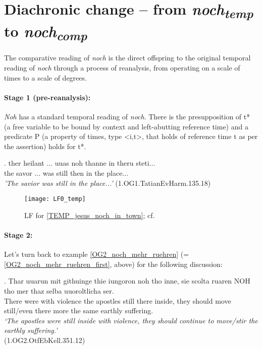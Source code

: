 \documentclass[output=paper,
modfonts
]{langscibook}
\begin{document}

\section{Diachronic change -- from \textit{noch\textsubscript{temp}} to \textit{noch\textsubscript{comp}}}\label{sec_diachr_analysis}

The comparative reading of \textit{noch} is the direct offspring to the original temporal reading of \textit{noch} through a process of reanalysis, from operating on a scale of times to a scale of degrees.

\paragraph*{Stage 1 (pre-reanalysis):} \textit{Noh} has a standard temporal reading of \textit{noch}. There is the presupposition of t* (a free variable to be bound by context and left-abutting reference time) and a predicate P (a property of times, type <i,t>, that holds of reference time t as per the assertion) holds for t*.

\exg. ther heilant ... uuas noh thanne in theru steti...\\
the savor ... was still then in the place...\\
\textit{'The savior was still in the place...'}
(1.OG1.TatianEvHarm.135.18)\label{TEMP_jesus_noch_in_town}

\begin{figure}[H]
\texttt{[image: LF0\_temp]}
\caption{LF for \ref{TEMP_jesus_noch_in_town}; cf. \citep{beck2016a_sub}}
\label{fig:LF_TEMP_jesus_noch_in_town}
\end{figure}

\paragraph*{Stage 2:} Let's turn back to example \ref{OG2_noch_mehr_ruehren} (= \ref{OG2_noch_mehr_ruehren_first}, above) for the following discussion:

\exg. Thar uuarun mit githuinge thie iungoron noh tho inne, sie scolta ruaren NOH tho mer thaz selba uuoroltlicha ser.\\
There were with violence the apostles still there inside, they should move still/even there more the same earthly suffering.\\
\textit{`The apostles were still inside with violence, they should continue to move/stir the earthly suffering.'}\label{OG2_noch_mehr_ruehren} \\ \flushright \vspace{-24pt} (1.OG2.OtfEbKell.351.12)
\end{document}
